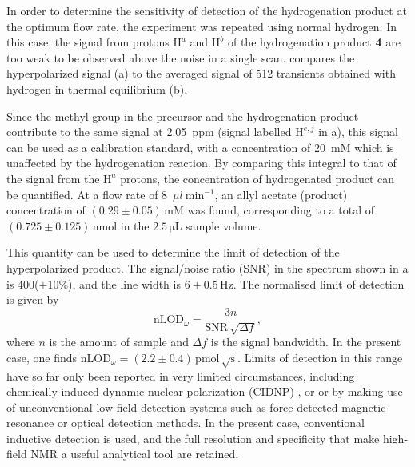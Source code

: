 In order to determine the sensitivity of detection of the hydrogenation product
at the optimum flow rate, the experiment was repeated using normal hydrogen.
In this case, the signal from  protons $\mathrm{H}^a$ and $\mathrm{H}^b$
of the hydrogenation product \textbf{4}
are too weak to be observed above the noise in a single scan.
compares the hyperpolarized signal (a) to the averaged signal of 512 transients
obtained with hydrogen in thermal equilibrium (b).

Since the methyl group in the
precursor and the hydrogenation product contribute to the same signal at 2.05~ppm
(signal labelled $\mathrm{H}^{e,j}$ in a),
this signal can be used as a calibration standard, with a concentration of 20~mM
which is unaffected by the hydrogenation reaction. By comparing this integral to that
of the signal from the $\mathrm{H}^a$ protons, the concentration
of hydrogenated product can be
quantified. At a flow rate of 8~$\mu{l}~\text{min}^{-1}$, an allyl acetate
(product) concentration of $(0.29\pm 0.05)\,\mathrm{mM}$ was found, corresponding to a total
of $(0.725\pm0.125)\,\text{nmol}$ in the $2.5\,\mathrm{\mu L}$ sample volume.


This quantity can be used to determine the limit of detection of the
hyperpolarized product. The signal/noise ratio (SNR) in the spectrum shown in
a is 400($\pm 10\%$), and the line width is $6\pm
0.5\,\text{Hz}$. The normalised limit of detection is given by \[
\text{nLOD}_\omega = \frac{3 n}{\text{SNR}\,\sqrt{\Delta f}}, \] where $n$ is
the amount of sample and $\Delta f$ is the signal bandwidth. In the present
case, one finds $\text{nLOD}_\omega = (2.2\pm
0.4)\,\text{pmol}\,\sqrt{\text{s}}$. Limits of detection in this range have so
far only been reported in very limited circumstances, including
chemically-induced dynamic nuclear polarization (CIDNP)
\cite{mompean2018pushing}, or or by making use of unconventional low-field
detection systems
such as force-detected magnetic resonance or optical detection methods\cite{Rugar:1992dm,Rugar:2004bc,Mamin:2007ff,Poggio:2010jf,
Maze:2008cs,Staudacher:2013kn,Rugar:2015by,McDermott:2002hp,
Budker:2007hz,Xu:2006kg,Blanchard:2013gs}. In the
present case, conventional inductive detection is used, and the full
resolution and specificity that make high-field NMR a useful
analytical tool are retained.

